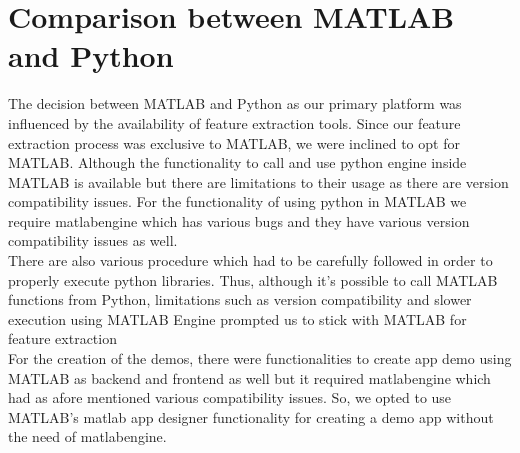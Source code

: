 \section{Comparison between MATLAB and Python}
The decision between MATLAB and Python as our primary platform was influenced by the availability of feature extraction tools. Since our feature extraction process was exclusive to MATLAB, we were inclined to opt for MATLAB. Although the functionality to call and use python engine inside MATLAB is available but there are limitations to their usage as there are version compatibility issues. For the functionality of using python in MATLAB we require matlabengine which has various bugs and they have various version compatibility issues as well.\\
There are also various procedure which had to be carefully followed in order to properly execute python libraries. 
Thus, although it’s possible to call MATLAB functions from Python, limitations such as version compatibility and slower execution using MATLAB Engine prompted us to stick with MATLAB for feature extraction\\
For the creation of the demos, there were functionalities to create app demo using MATLAB as backend and frontend as well but it required matlabengine which had as afore mentioned various compatibility issues. So, we opted to use MATLAB's matlab app designer functionality for creating a demo app without the need of matlabengine.








